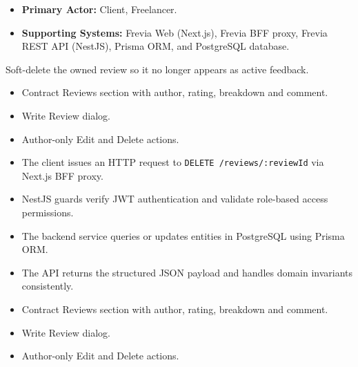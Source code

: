
\begin{itemize}[leftmargin=1.6em,topsep=3pt,itemsep=2pt,parsep=0pt,label=$\bullet$]
    \item \textbf{Primary Actor:} Client, Freelancer.
    \item \textbf{Supporting Systems:} Frevia Web (Next.js), Frevia BFF proxy, Frevia REST API (NestJS), Prisma ORM, and PostgreSQL database.
\end{itemize}

\noindent Soft-delete the owned review so it no longer appears as active feedback.

\begin{itemize}[leftmargin=1.6em,topsep=3pt,itemsep=2pt,parsep=0pt,label=$\bullet$]
    \item Contract Reviews section with author, rating, breakdown and comment.
    \item Write Review dialog.
    \item Author-only Edit and Delete actions.
\end{itemize}

\begin{itemize}[leftmargin=1.6em,topsep=3pt,itemsep=2pt,parsep=0pt,label=$\bullet$]
    \item The client issues an HTTP request to \texttt{DELETE /\allowbreak{}reviews/\allowbreak{}:\allowbreak{}reviewId} via Next.js BFF proxy.
    \item NestJS guards verify JWT authentication and validate role-based access permissions.
    \item The backend service queries or updates entities in PostgreSQL using Prisma ORM.
    \item The API returns the structured JSON payload and handles domain invariants consistently.
\end{itemize}

\begin{itemize}[leftmargin=1.6em,topsep=3pt,itemsep=2pt,parsep=0pt,label=$\bullet$]
    \item Contract Reviews section with author, rating, breakdown and comment.
    \item Write Review dialog.
    \item Author-only Edit and Delete actions.
\end{itemize}

